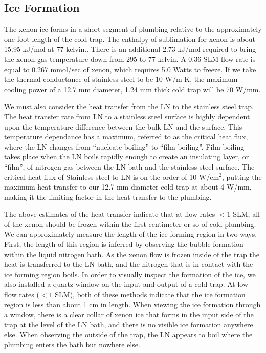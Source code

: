\documentclass[12pt]{article}
\begin{document}
\subsection{Ice Formation}
The xenon ice forms in a short segment of plumbing relative to the approximately one foot length of the cold trap. The enthalpy of sublimation for xenon is about 15.95 kJ/mol at 77 kelvin.\cite{vaporpressure}. There is an additional 2.73 kJ/mol required to bring the xenon gas temperature down from 295 to 77 kelvin. A 0.36 SLM flow rate is equal to 0.267 mmol/sec of xenon, which requires 5.0 Watts to freeze. If we take the thermal conductance of stainless steel to be 10 W/m K, the maximum cooling power of a 12.7 mm diameter, 1.24 mm thick cold trap will be 70 W/mm. 

We must also consider the heat transfer from the LN to the stainless steel trap. The heat transfer rate from LN to a stainless steel surface is highly dependent upon the temperature difference between the bulk LN and the surface. This temperature dependance has a maximum, referred to as the critical heat flux, where the LN changes from ``nucleate boiling'' to ``film boiling''. Film boiling takes place when the LN boils rapidly enough to create an insulating layer, or ``film'', of nitrogen gas between the LN bath and the stainless steel surface. The critical heat flux of Stainless steel to LN is on the order of 10 W/cm$^2$, putting the maximum heat transfer to our 12.7 mm diameter cold trap at about 4 W/mm, making it the limiting factor in the heat transfer to the plumbing.\cite{LNheatflux}

The above estimates of the heat transfer indicate that at flow rates $<1$ SLM, all of the xenon should be frozen within the first centimeter or so of cold plumbing. We can approximately measure the length of the ice-forming region in two ways. First, the length of this region is inferred by observing the bubble formation within the liquid nitrogen bath. As the xenon flow is frozen inside of the trap the heat is transferred to the LN bath, and the  nitrogen that is in contact with the ice forming region boils. In order to visually inspect the formation of the ice, we also installed a quartz window on the input and output of a cold trap. At low flow rates ($<1$ SLM), both of these methods indicate that the ice formation region is less than about 1 cm in length. When viewing the ice formation through a window, there is a clear collar of xenon ice that forms in the input side of the trap at the level of the LN bath, and there is no visible ice formation anywhere else. When observing the outside of the trap, the LN appears to boil where the plumbing enters the bath but nowhere else. 
\end{document}
